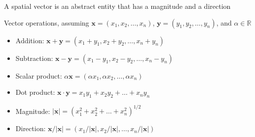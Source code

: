 \documentclass[8pt,a4paper,compress]{beamer}
\begin{document}
\begin{frame}[fragile]
\pause

\begin{minipage}{200pt}
A spatial vector is an abstract entity that has a magnitude and a direction
\end{minipage}%
\hfill
\begin{minipage}{100pt}
\begin{center}
\end{center}
\end{minipage}%

\pause
\bigskip

Vector operations, assuming $\mathbf{x}=(x_1,x_2,\dots,x_n)$, $\mathbf{y}=(y_1,y_2,\dots,y_n)$, and $\alpha \in \mathbb{R}$
\begin{itemize}
\item Addition: $\mathbf{x}+\mathbf{y}=(x_1+y_1,x_2+y_2,\dots,x_n+y_n)$
\item Subtraction: $\mathbf{x}-\mathbf{y}=(x_1-y_1,x_2-y_2,\dots,x_n-y_n)$
\item Scalar product: $\alpha\mathbf{x}=(\alpha x_1,\alpha x_2,\dots,\alpha x_n)$
\item Dot product: $\mathbf{x}\cdot\mathbf{y}=x_1y_1+x_2y_2+\dots+x_ny_n$
\item Magnitude: $|\mathbf{x}|=(x_1^2+x_2^2+\dots+x_n^2)^{1/2}$
\item Direction: $\mathbf{x}/|\mathbf{x}|=(x_1/|\mathbf{x}|,x_2/|\mathbf{x}|,\dots,x_n/|\mathbf{x}|)$
\end{itemize}
\end{frame}
\end{document}
